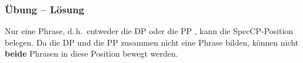 
\begin{frame}
\frametitle{Übung -- Lösung}

\begin{minipage}[b]{0.45\textwidth}
	\centering
\end{minipage}  
%            
%         
\begin{minipage}[b]{0.45\textwidth}
{\small 
	Nur eine Phrase, d.\,h.\ entweder die DP  oder die PP , kann die SpecCP-Position belegen. Da die DP und die PP zusammen nicht eine Phrase bilden, können nicht \textbf{beide} Phrasen in diese Position bewegt werden.
}
\end{minipage}  

\end{frame}